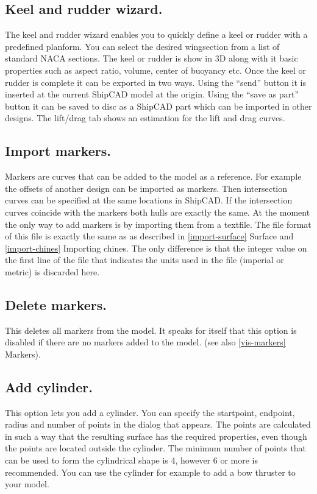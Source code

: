 \documentclass[12pt]{article}
\begin{document}
\subsection{Keel and rudder wizard.}
The keel and rudder wizard enables you to quickly define a keel or
rudder with a predefined planform. You can select the desired
wingsection from a list of standard NACA sections. The keel or rudder
is show in 3D along with it basic properties such as aspect ratio,
volume, center of buoyancy etc.  Once the keel or rudder is complete
it can be exported in two ways. Using the “send” button it is inserted
at the current ShipCAD model at the origin. Using the “save as part”
button it can be saved to disc as a ShipCAD part which can be imported
in other designs. The lift/drag tab shows an estimation for the lift
and drag curves.

\subsection{Import markers.}
Markers are curves that can be added to the model as a reference. For
example the offsets of another design can be imported as markers. Then
intersection curves can be specified at the same locations in
ShipCAD. If the intersection curves coincide with the markers both
hulls are exactly the same. At the moment the only way to add markers
is by importing them from a textfile. The file format of this file is
exactly the same as as described in \ref{import-surface} Surface and
\ref{import-chines} Importing
chines.  The only difference is that the integer value on the first
line of the file that indicates the units used in the file (imperial
or metric) is discarded here.

\subsection{Delete markers.}
This deletes all markers from the model. It speaks for itself that
this option is disabled if there are no markers added to the
model. (see also \ref{vis-markers} Markers).

\subsection{Add cylinder.}
This option lets you add a cylinder. You can specify the startpoint,
endpoint, radius and number of points in the dialog that appears. The
points are calculated in such a way that the resulting surface has the
required properties, even though the points are located outside the
cylinder. The minimum number of points that can be used to form the
cylindrical shape is 4, however 6 or more is recommended. You can use
the cylinder for example to add a bow thruster to your model.
\end{document}
